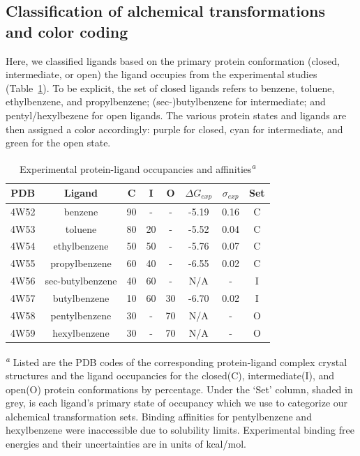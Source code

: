 \documentclass[journal=jctcce,manuscript=article]{achemso}
\begin{document}
\subsection*{Classification of alchemical transformations and color coding}
Here, we classified ligands based on the primary protein conformation (closed, intermediate, or open) the ligand occupies from the experimental studies (Table~\ref{tbl:expdata}).
To be explicit, the set of closed ligands refers to benzene, toluene, ethylbenzene, and propylbenzene; (sec-)butylbenzene for intermediate; and pentyl/hexylbezene for open ligands.
The various protein states and ligands are then assigned a color accordingly: purple for closed, cyan for intermediate, and green for the open state.

\begin{table}[!htb]
\centering
\caption{Experimental protein-ligand occupancies and affinities\textsuperscript{\emph{a}}}
\label{tbl:expdata}
\begin{tabular}{|c|c|c|c|c|c|c|c|}
\hline
\textbf{PDB}  & \textbf{Ligand} & \textbf{C} & \textbf{I} & \textbf{O} & \boldmath$\Delta G_{exp}$  & \boldmath$\sigma_{exp}$ &  \textbf{Set} \\ \hline
4W52   &  benzene          & \cellcolor[HTML]{C0C0C0}90   & -     & -    & -5.19      & 0.16       &  C             \\ \hline
4W53   &  toluene          & \cellcolor[HTML]{C0C0C0}80   & 20   & -    & -5.52      & 0.04       & C   \\ \hline
4W54   &  ethylbenzene     & \cellcolor[HTML]{C0C0C0}50    & 50   & -    & -5.76      & 0.07       & C   \\ \hline
4W55   &  propylbenzene  & \cellcolor[HTML]{C0C0C0}60    & 40   & -    & -6.55      & 0.02       & C   \\ \hline
4W56   &  sec-butylbenzene & 40        & \cellcolor[HTML]{C0C0C0}60      & -    & N/A      & -     &  I   \\ \hline
4W57   &  butylbenzene   & 10        & \cellcolor[HTML]{C0C0C0}60      & 30   & -6.70   & 0.02  &  I   \\ \hline
4W58   &  pentylbenzene  & 30        &  -       & \cellcolor[HTML]{C0C0C0}70  & N/A     & -      &  O   \\ \hline
4W59   &  hexylbenzene   & 30        &  -       & \cellcolor[HTML]{C0C0C0}70  & N/A     & -     & O   \\ \hline
\end{tabular}

\textsuperscript{\emph{a}} Listed are the PDB codes of the corresponding protein-ligand complex crystal structures and the ligand occupancies\cite{Merski2015} for the closed(C), intermediate(I), and open(O) protein conformations by percentage. 
Under the `Set' column, shaded in grey, is each ligand's primary state of occupancy which we use to categorize our alchemical transformation sets.
Binding affinities for pentylbenzene and hexylbenzene were inaccessible due to solubility limits\cite{Merski2015}. 
Experimental binding free energies and their uncertainties are in units of kcal/mol\cite{T4affinity}.
\end{table}
\end{document}
